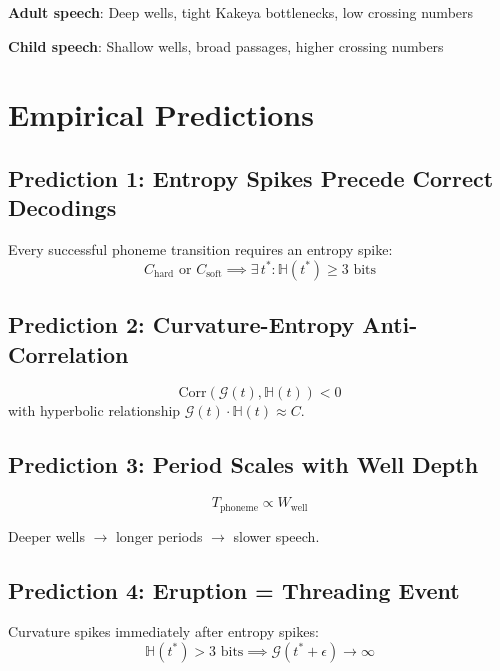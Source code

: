 \documentclass[12pt]{article}
\begin{document}
\textbf{Adult speech}: Deep wells, tight Kakeya bottlenecks, low crossing numbers

\textbf{Child speech}: Shallow wells, broad passages, higher crossing numbers

\section{Empirical Predictions}

\subsection{Prediction 1: Entropy Spikes Precede Correct Decodings}

Every successful phoneme transition requires an entropy spike:
\begin{equation}
C_{\text{hard}} \text{ or } C_{\text{soft}} \implies \exists \, t^* : \mathbb{H}(t^*) \ge 3 \text{ bits}
\end{equation}

\subsection{Prediction 2: Curvature-Entropy Anti-Correlation}

\begin{equation}
\text{Corr}(\mathcal{G}(t), \mathbb{H}(t)) < 0
\end{equation}
with hyperbolic relationship $\mathcal{G}(t) \cdot \mathbb{H}(t) \approx C$.

\subsection{Prediction 3: Period Scales with Well Depth}

\begin{equation}
T_{\text{phoneme}} \propto W_{\text{well}}
\end{equation}

Deeper wells $\to$ longer periods $\to$ slower speech.

\subsection{Prediction 4: Eruption = Threading Event}

Curvature spikes immediately after entropy spikes:
\begin{equation}
\mathbb{H}(t^*) > 3 \text{ bits} \implies \mathcal{G}(t^* + \epsilon) \to \infty
\end{equation}
\end{document}
